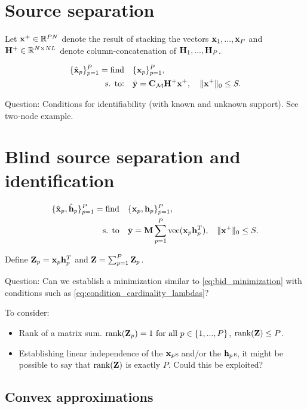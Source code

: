 \documentclass{article}
\def\x{{\mathbf x}}
\def\y{{\mathbf y}}
\def\h{{\mathbf h}}
\begin{document}
\section*{Source separation}

Let ${\mathbf x}^+ \in {\mathbb R}^{PN}$ denote the result of stacking the vectors ${\mathbf x}_1, ..., {\mathbf x}_P$ and ${\mathbf H}^+ \in {\mathbb R}^{N \times NL}$ denote column-concatenation of ${\mathbf H}_1, ..., {\mathbf H}_P$.

\begin{align}
\label{eq:ss_feasibility}
\{\hbx_p\}_{p=1}^P=\mathop{\text{find}} \quad & \{\bbx_p\}_{p=1}^P,  \\
\text{s. to:} \quad & \bar{\y} = \bbC_{\ccalM} \bbH^+ \x^+, \quad \|\x^+\|_{0}\leq S. \nonumber
\end{align}

\noindent
Question: Conditions for identifiability (with known and unknown support). See two-node example.



\section*{Blind source separation and identification}

\begin{align}
\label{eq:bss_feasibility}
   \{\hbx_p,\hbh_p\}_{p=1}^{P}=\text{find} \quad &\{\x_p,\h_p\}_{p=1}^{P}, \\
  \text{s. to} \quad & \bar{\y} = \bbM \sum_{p=1}^{P} \text{vec}(\x_p \h_p^T), \;\; \|\x^+\|_0 \leq S. \nonumber
\end{align}

\noindent
Define ${\mathbf Z}_p = {\mathbf x}_p{\mathbf h}_p^T$ and ${\mathbf Z} = \sum_{p=1}^P {\mathbf Z}_p$.

\noindent
Question: Can we establish a minimization similar to \eqref{eq:bid_minimization} with conditions such as \eqref{eq:condition_cardinality_lambdas}?

\noindent
To consider:
\begin{itemize}
  \item Rank of a matrix sum. $\text{rank}({\mathbf Z}_p)=1 \ \text{\normalfont for all} \ p \in \{1,...,P\}$, $\text{rank}({\mathbf Z}) \leq P$.
  \item Establishing linear independence of the ${\mathbf x}_p$s and/or the ${\mathbf h}_p$s, it might be possible to say that $\text{rank}({\mathbf Z})$ is exactly $P$. Could this be exploited?
\end{itemize}

\subsection*{Convex approximations}
\end{document}
